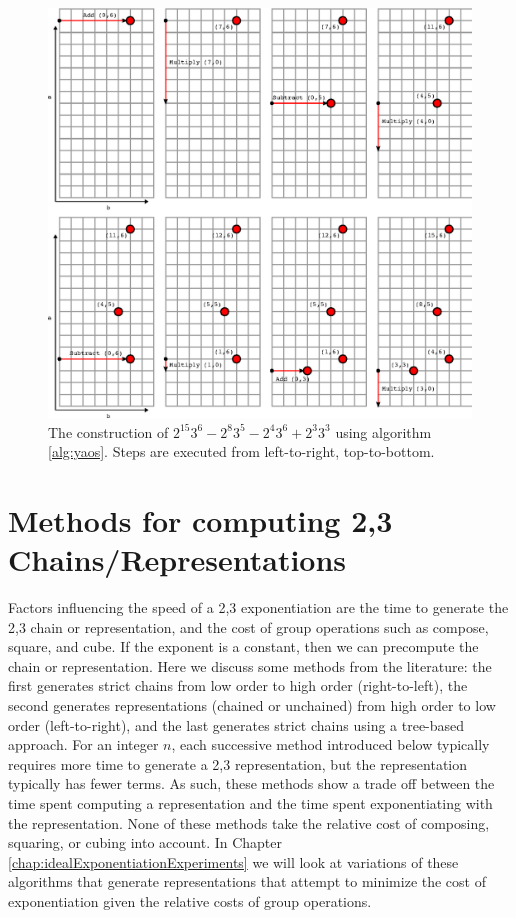\documentclass{ucalgthes1}
\theoremstyle{definition}
\begin{document}
\begin{figure}[H]
\centering
\includegraphics{yao1}
\caption{The construction of $2^{15} 3^6 - 2^8 3^5 - 2^4 3^6 + 2^3 3^3$ using algorithm \ref{alg:yaos}.  Steps are executed from left-to-right, top-to-bottom.}
\label{fig:yao1}
\end{figure}


\bigbreak
\section{Methods for computing 2,3 Chains/Representations}
\label{section:dbnsMethods}

Factors influencing the speed of a 2,3 exponentiation are the time to generate the 2,3 chain or representation, and the cost of group operations such as compose, square, and cube. If the exponent is a constant, then we can precompute the chain or representation. Here we discuss some methods from the literature: the first generates strict chains from low order to high order (right-to-left), the second generates representations (chained or unchained) from high order to low order (left-to-right), and the last generates strict chains using a tree-based approach.  For an integer $n$, each successive method introduced below typically requires more time to generate a 2,3 representation, but the representation typically has fewer terms.  As such, these methods show a trade off between the time spent computing a representation and the time spent exponentiating with the representation.  None of these methods take the relative cost of composing, squaring, or cubing into account.  In Chapter \ref{chap:idealExponentiationExperiments} we will look at variations of these algorithms that generate representations that attempt to minimize the cost of exponentiation given the relative costs of group operations.
\end{document}
